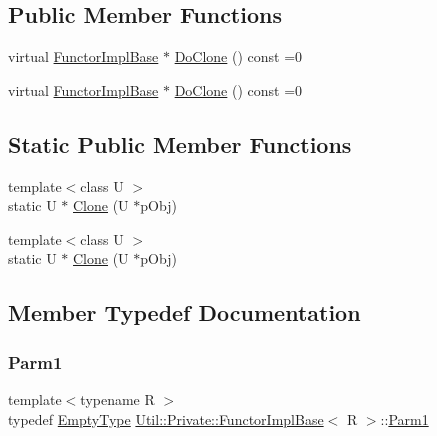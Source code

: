 \subsection*{Public Member Functions}
\begin{DoxyCompactItemize}
\item 
virtual \mbox{\hyperlink{structUtil_1_1Private_1_1FunctorImplBase}{Functor\+Impl\+Base}} $\ast$ \mbox{\hyperlink{structUtil_1_1Private_1_1FunctorImplBase_a3e0e91d434c55173ed546839b53721c5}{Do\+Clone}} () const =0
\item 
virtual \mbox{\hyperlink{structUtil_1_1Private_1_1FunctorImplBase}{Functor\+Impl\+Base}} $\ast$ \mbox{\hyperlink{structUtil_1_1Private_1_1FunctorImplBase_a3e0e91d434c55173ed546839b53721c5}{Do\+Clone}} () const =0
\end{DoxyCompactItemize}
\subsection*{Static Public Member Functions}
\begin{DoxyCompactItemize}
\item 
{\footnotesize template$<$class U $>$ }\\static U $\ast$ \mbox{\hyperlink{structUtil_1_1Private_1_1FunctorImplBase_a6422eebe7e94d8eb6f17e14d67c283f1}{Clone}} (U $\ast$p\+Obj)
\item 
{\footnotesize template$<$class U $>$ }\\static U $\ast$ \mbox{\hyperlink{structUtil_1_1Private_1_1FunctorImplBase_a6422eebe7e94d8eb6f17e14d67c283f1}{Clone}} (U $\ast$p\+Obj)
\end{DoxyCompactItemize}


\subsection{Member Typedef Documentation}
\mbox{\label{structUtil_1_1Private_1_1FunctorImplBase_a9d61e693d6c616dea5bd9d9073c7d21a}} 
\subsubsection{\texorpdfstring{Parm1}{Parm1}\hspace{0.1cm}{\footnotesize\ttfamily [1/2]}}
{\footnotesize\ttfamily template$<$typename R $>$ \\
typedef \mbox{\hyperlink{classUtil_1_1EmptyType}{Empty\+Type}} \mbox{\hyperlink{structUtil_1_1Private_1_1FunctorImplBase}{Util\+::\+Private\+::\+Functor\+Impl\+Base}}$<$ R $>$\+::\mbox{\hyperlink{structUtil_1_1Private_1_1FunctorImplBase_a9d61e693d6c616dea5bd9d9073c7d21a}{Parm1}}}

